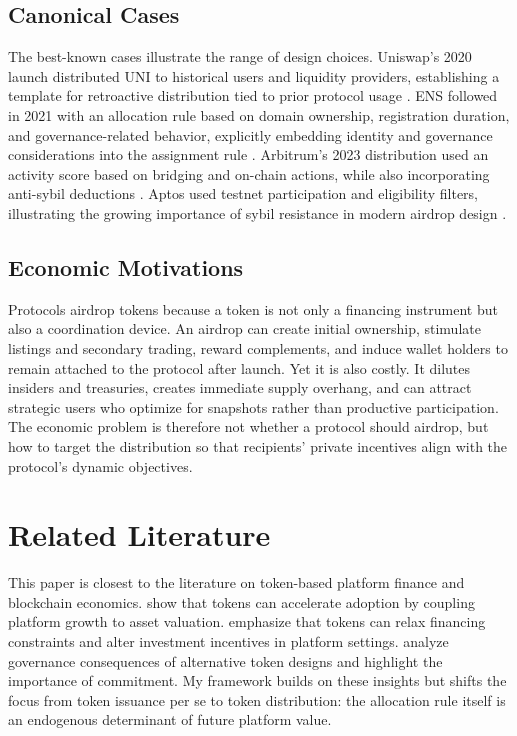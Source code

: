 \documentclass[11pt]{article}
\theoremstyle{remark}
\begin{document}
\subsection{Canonical Cases}

The best-known cases illustrate the range of design choices. Uniswap's 2020 launch distributed UNI to historical users and liquidity providers, establishing a template for retroactive distribution tied to prior protocol usage \citep{uniswap2020uni}. ENS followed in 2021 with an allocation rule based on domain ownership, registration duration, and governance-related behavior, explicitly embedding identity and governance considerations into the assignment rule \citep{ens2026token}. Arbitrum's 2023 distribution used an activity score based on bridging and on-chain actions, while also incorporating anti-sybil deductions \citep{arbitrum2023decentralization}. Aptos used testnet participation and eligibility filters, illustrating the growing importance of sybil resistance in modern airdrop design \citep{aptos2022airdrop}.

\subsection{Economic Motivations}

Protocols airdrop tokens because a token is not only a financing instrument but also a coordination device. An airdrop can create initial ownership, stimulate listings and secondary trading, reward complements, and induce wallet holders to remain attached to the protocol after launch. Yet it is also costly. It dilutes insiders and treasuries, creates immediate supply overhang, and can attract strategic users who optimize for snapshots rather than productive participation. The economic problem is therefore not whether a protocol should airdrop, but how to target the distribution so that recipients' private incentives align with the protocol's dynamic objectives.

\section{Related Literature}

This paper is closest to the literature on token-based platform finance and blockchain economics. \citet{cong2021tokenomics} show that tokens can accelerate adoption by coupling platform growth to asset valuation. \citet{cong2022tokenbased} emphasize that tokens can relax financing constraints and alter investment incentives in platform settings. \citet{abadi2024token} analyze governance consequences of alternative token designs and highlight the importance of commitment. My framework builds on these insights but shifts the focus from token issuance per se to token distribution: the allocation rule itself is an endogenous determinant of future platform value.
\end{document}
